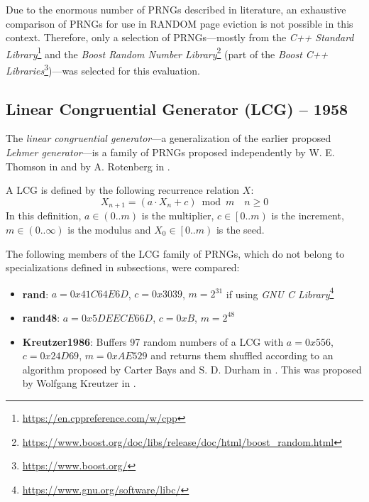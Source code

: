     Due to the enormous number of PRNGs described in literature, an exhaustive comparison of PRNGs for use in RANDOM page eviction is not possible in this context. Therefore, only a selection of PRNGs---mostly from the \textit{C++ Standard Library}\footnote{\url{https://en.cppreference.com/w/cpp}} and the \textit{Boost Random Number Library}\footnote{\url{https://www.boost.org/doc/libs/release/doc/html/boost_random.html}} (part of the \textit{Boost C++ Libraries}\footnote{\url{https://www.boost.org/}})---was selected for this evaluation.

\subsection[Linear Congruential Generator (LCG) -- 1958]{Linear Congruential Generator (LCG) -- 1958} \label{subsec:lcg}

    The \emph{linear congruential generator}---a generalization of the earlier proposed \emph{Lehmer generator}---is a family of PRNGs proposed independently by W. E. Thomson in \cite{Thomson:1958} and by A. Rotenberg in \cite{Rotenberg:1960}.

    A LCG is defined by the following recurrence relation $X$:
    \begin{equation*}
        X_{n + 1} = \left(a \cdot X_n + c\right) \bmod m \quad n \geq 0
    \end{equation*}
    In this definition, $a \in \left(0.. m\right)$ is the multiplier, $c \in \left[0.. m\right)$ is the increment, $m \in \left(0.. \infty\right)$ is the modulus and $X_0 \in \left[0.. m\right)$ is the seed.

    The following members of the LCG family of PRNGs, which do not belong to specializations defined in subsections, were compared:
    \begin{itemize}
		\itemsep0em
        \item \textbf{rand}: $a = 0x41C64E6D$, $c = 0x3039$, $m = 2^{31}$ if using \textit{GNU C Library}\footnote{\url{https://www.gnu.org/software/libc/}}
        \item \textbf{rand48}: $a = 0x5DEECE66D$, $c = 0xB$, $m = 2^{48}$
        \item \textbf{Kreutzer1986}: Buffers 97 random numbers of a LCG with $a = 0x556$, $c = 0x24D69$, $m = 0xAE529$ and returns them shuffled according to an algorithm proposed by Carter Bays and S. D. Durham in \cite{Bays:1976}. This was proposed by Wolfgang Kreutzer in \cite{Kreutzer:1986}.
    \end{itemize}

